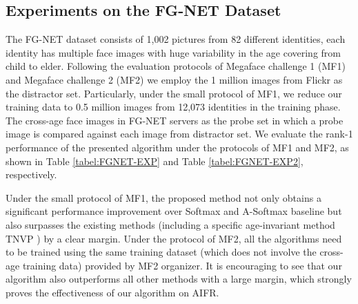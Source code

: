\documentclass[runningheads]{llncs}
\begin{document}
\subsection{Experiments on the FG-NET Dataset}
\label{sec4_4}

The FG-NET dataset consists of 1,002 pictures from 82 different identities, each identity has multiple face images with huge variability in the age covering from child to elder.
Following the evaluation protocols of Megaface challenge 1 (MF1) \cite{mf1} and Megaface challenge 2 (MF2) \cite{mf2} we employ the 1 million images from Flickr as the distractor set.
Particularly, under the small protocol of MF1, we reduce our training data to 0.5 million images from 12,073 identities in the training phase.
The cross-age face images in FG-NET servers as the probe set in which a probe image is compared against each image from distractor set. We evaluate the rank-1 performance of the presented algorithm under the protocols of MF1 and MF2, as shown in Table \ref{tabel:FGNET-EXP} and Table \ref{tabel:FGNET-EXP2}, respectively.

Under the small protocol of MF1, the proposed method not only obtains a significant performance improvement over Softmax and A-Softmax baseline but also surpasses the existing methods (including a specific age-invariant method TNVP \cite{TNVP}) by a clear margin.
Under the protocol of MF2, all the algorithms need to be trained using the same training dataset (which does not involve the cross-age training data) provided by MF2 organizer. It is encouraging to see that our algorithm also outperforms all other methods with a large margin, which strongly proves the effectiveness of our algorithm on AIFR.
\end{document}
